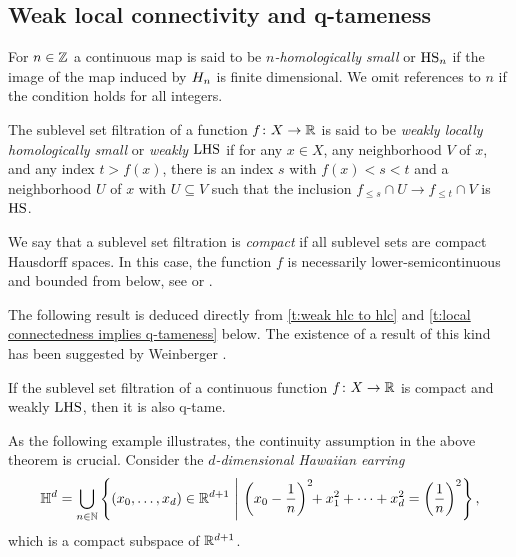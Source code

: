 \subsection{Weak local connectivity and q-tameness}

\begin{defi}
	For $n \in \mathbb{Z}$ a continuous map is said to be \emph{$n$-homologically small} or $\mathrm{HS}_n$ if the image of the map induced by $H_{n}$ is finite dimensional.
	We omit references to $n$ if the condition holds for all integers.
\end{defi}

\begin{defi}
	The sublevel set filtration of a function $f \colon X \to \mathbb{R}$ is said to be \emph{weakly locally homologically small} or \emph{weakly $\mathrm{LHS}$} if for any $x \in X$, any neighborhood $V$ of $x$, and any index $t > f(x)$, there is an index $s$ with $f(x) < s < t$ and a neighborhood $U$ of $x$ with $U \subseteq V$ such that the inclusion $f_{\leq s} \cap U \to f_{\leq t} \cap V$ is $\mathrm{HS}$.
\end{defi}

\begin{defi}
	We say that a sublevel set filtration is \emph{compact} if all sublevel sets are compact Hausdorff spaces.
	In this case, the function $f$ is necessarily lower-semicontinuous and bounded from below, see \cite[p.~444]{Morse.1939} or \cite[Theorem 3.1]{Struwe.1988}.
\end{defi}

The following result is deduced directly from \cref{t:weak hlc to hlc} and \cref{t:local connectedness implies q-tameness} below.
The existence of a result of this kind has been suggested by Weinberger \cite{Weinberger.2011}.

\begin{thm} \label{t:q-tameness for continuous functions}
	If the sublevel set filtration of a continuous function $f \colon X \to \mathbb{R}$ is compact and weakly $\mathrm{LHS}$, then it is also q-tame.
\end{thm}

As the following example illustrates, the continuity assumption in the above theorem is crucial.
Consider the \emph{$d$-dimensional Hawaiian earring}
\begin{equation*}
\mathbb{H}^d = \bigcup_{n \in \mathbb{N}} \left\{ (x_0, \dots, x_d) \in \mathbb{R}^{d+1} \ \middle | \ \left( x_0 - \frac{1}{n} \right)^2 \!\! + x_1^2 + \dots + x_d^2 = \left( \frac{1}{n} \right)^2 \right\},
\end{equation*}
which is a compact subspace of $\mathbb{R}^{d+1}$.


